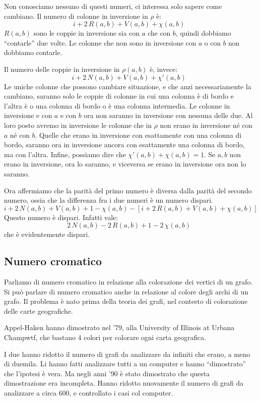 	Non conosciamo nessuno di questi numeri, ci interessa solo sapere come cambiano.
	Il numero di colonne in inversione in $\rho$ \`e:
	\[
		i + 2 \, R(a,b) + V(a,b) + \chi(a,b)
	\]
	$R(a,b)$ sono le coppie in inversione sia con $a$ che con $b$, quindi dobbiamo ``contarle'' due volte.
	Le colonne che non sono in inversione con $a$ o con $b$ non dobbiamo contarle.

	Il numero delle coppie in inversione in $\rho (a,b)$ \`e, invece:
	\[
		i + 2 \, N(a,b) + V(a,b) + \chi'(a,b)
	\]
	Le uniche colonne che possono cambiare situazione, e che anzi necessariamente la cambiano, saranno solo le coppie di colonne in cui una colonna \`e di bordo e l'altra \`e o una colonna di bordo o \`e una colonna intermedia.
	Le colonne in inversione e con $a$ e con $b$ ora non saranno in inversione con nessuna delle due.
	Al loro posto avremo in inversione le colonne che in $\rho$ non erano in inversione n\'e con $a$ n\'e con $b$.
	Quelle che erano in inversione con esattamente con una colonna di bordo, saranno ora in inversione ancora con esattamente una colonna di bordo, ma con l'altra.
	Infine, possiamo dire che $\chi'(a,b) + \chi(a,b) = 1$.
	Se $a,b$ non erano in inversione, ora lo saranno, e viceversa se erano in inversione ora non lo saranno.

	Ora affermiamo che la parit\`a del primo numero \`e diversa dalla parit\`a del secondo numero, ossia che la differenza fra i due numeri \`e un numero dispari.
	\[
		i + 2 \, N(a,b) + V(a,b) + 1 - \chi(a,b) - \left[ i + 2 \, R(a,b) + V(a,b) + \chi (a,b) \right]
	\]
	Questo numero \`e dispari.
	Infatti vale:
	\[
		2 \, N(a,b) - 2 \, R(a,b) + 1 - 2 \, \chi(a,b)
	\]
	che \`e evidentemente dispari.

	\subsection{Numero cromatico}

	Parliamo di numero cromatico in relazione alla colorazione dei vertici di un grafo.
	Si pu\`o parlare di numero cromatico anche in relazione al colore degli archi di un grafo.
	Il problema \`e nato prima della teoria dei grafi, nel contesto di colorazione delle carte geografiche.

	Appel-Haken hanno dimostrato nel '79, alla University of Illinois at Urbana Champwtf, che bastano 4 colori per colorare ogni carta geografica.

	I due hanno ridotto il numero di grafi da analizzare da infiniti che erano, a meno di duemila.
	Li hanno fatti analizzare tutti a un computer e hanno ``dimostrato'' che l'ipotesi \`e vera.
	Ma negli anni '90 \`e stato dimostrato che questa dimostrazione era incompleta.
	Hanno ridotto nuovamente il numero di grafi da analizzare a circa 600, e controllato i casi col computer.

